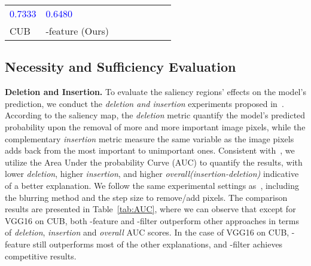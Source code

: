 \begin{table*}[ht]
{\begin{tabular}{p{2cm}<{\centering}| p{3.5cm}<{\centering}| p{1.8cm}<{\centering} p{1.8cm}<{\centering} p{1.8cm}<{\centering}| p{1.8cm}<{\centering} p{1.8cm}<{\centering} p{1.8cm}<{\centering}}
  \cellcolor[HTML]{EFEFEF} {\textcolor{blue}{0.7333}}&
  \cellcolor[HTML]{EFEFEF} {\textcolor{blue}{0.6480}}\\
\multirow{-9}{*}{CUB} &
  \cellcolor[HTML]{EFEFEF}\name{}-feature (Ours) &
  \cellcolor[HTML]{EFEFEF}{\textcolor{Green}{0.0518}} &
  \cellcolor[HTML]{EFEFEF}{\textcolor{blue}{0.7591}} &
  \cellcolor[HTML]{EFEFEF}{\textcolor{Green}{0.7073}} &
  \cellcolor[HTML]{EFEFEF}{\textcolor{Green}{0.0842}}&
  \cellcolor[HTML]{EFEFEF}{\textcolor{Green}{0.7361}} &
  \cellcolor[HTML]{EFEFEF}{\textcolor{Green}{0.6519}} \\ \bottomrule[0.8pt]
\end{tabular}}
\caption{Comparative evaluation w.r.t.\;the \textit{deletion}, \textit{insertion}, and \textit{overall} AUC on the validation sets of ILSVRC and CUB with VGG16 and Inception\_v3,
with lower \textit{deletion}, higher \textit{insertion}, and higher \textit{overall} indicative of a better explanation. 
The \textcolor{Green} {first} and \textcolor{blue} {second} best performances are marked in \textcolor{Green} {green} and \textcolor{blue} {blue}, respectively.}
\label{tab:AUC}
\end{table*}

\subsection{Necessity and Sufficiency Evaluation}
\label{subsec:NS_eval}

\noindent \textbf{Deletion and Insertion.}
To evaluate the saliency regions' effects on the model's prediction, we conduct the \textit{deletion and insertion} experiments proposed in~\cite{petsiuk2018rise}.
According to the saliency map, the \textit{deletion} metric quantify the model's predicted probability upon the removal of more and more important image pixels, while the complementary \textit{insertion} metric measure the same variable as the image pixels adds back from the most important to unimportant ones.
Consistent with~\cite{petsiuk2018rise, zhang2021group}, we utilize the Area Under the probability Curve (AUC) to quantify the results, with lower \textit{deletion}, higher \textit{insertion}, and higher \textit{overall(insertion-deletion)} indicative of a better explanation.
We follow the same experimental settings as~\cite{zhang2021group}, including the blurring method and the step size to remove/add pixels. 
The comparison results are presented in Table~\ref{tab:AUC},
where we can observe that except for VGG16 on CUB, both \name{}-feature and \name{}-filter outperform other approaches in terms of \textit{deletion}, \textit{insertion} and \textit{overall} AUC scores. 
In the case of VGG16 on CUB, \name{}-feature still outperforms most of the other explanations, and \name{}-filter achieves competitive results.

